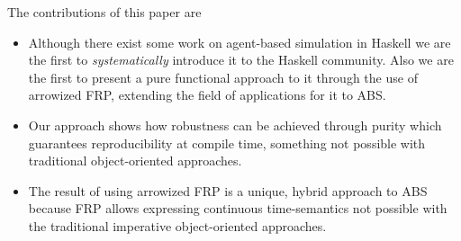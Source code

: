 The contributions of this paper are 
\begin{itemize}
	\item Although there exist some work on agent-based simulation in Haskell we are the first to \textit{systematically} introduce it to the Haskell community. Also we are the first to present a pure functional approach to it through the use of arrowized FRP, extending the field of applications for it to ABS.
	\item Our approach shows how robustness can be achieved through purity which guarantees reproducibility at compile time, something not possible with traditional object-oriented approaches.
	\item The result of using arrowized FRP is a unique, hybrid approach to ABS because FRP allows expressing continuous time-semantics not possible with the traditional imperative object-oriented approaches.
\end{itemize}